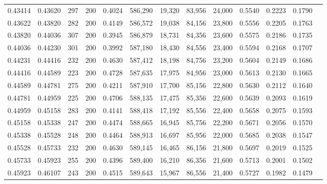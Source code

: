 \begin{tabular}{rrrrrrrrrrrrr}
0.43414 & 0.43620 &    297 & 200 &                                     0.4024 & 586,290 &  19,320 &  83,956 &  24,000 & 0.5540 & 0.2223 & 0.1790 \\
0.43622 & 0.43820 &    282 & 200 &                                     0.4149 & 586,572 &  19,038 &  84,156 &  23,800 & 0.5556 & 0.2205 & 0.1763 \\
0.43820 & 0.44036 &    307 & 200 &                                     0.3945 & 586,879 &  18,731 &  84,356 &  23,600 & 0.5575 & 0.2186 & 0.1735 \\
0.44036 & 0.44230 &    301 & 200 &                                     0.3992 & 587,180 &  18,430 &  84,556 &  23,400 & 0.5594 & 0.2168 & 0.1707 \\
0.44231 & 0.44416 &    232 & 200 &                                     0.4630 & 587,412 &  18,198 &  84,756 &  23,200 & 0.5604 & 0.2149 & 0.1686 \\
0.44416 & 0.44589 &    223 & 200 &                                     0.4728 & 587,635 &  17,975 &  84,956 &  23,000 & 0.5613 & 0.2130 & 0.1665 \\
0.44589 & 0.44781 &    275 & 200 &                                     0.4211 & 587,910 &  17,700 &  85,156 &  22,800 & 0.5630 & 0.2112 & 0.1640 \\
0.44781 & 0.44959 &    225 & 200 &                                     0.4706 & 588,135 &  17,475 &  85,356 &  22,600 & 0.5639 & 0.2093 & 0.1619 \\
0.44959 & 0.45158 &    283 & 200 &                                     0.4141 & 588,418 &  17,192 &  85,556 &  22,400 & 0.5658 & 0.2075 & 0.1593 \\
0.45158 & 0.45338 &    247 & 200 &                                     0.4474 & 588,665 &  16,945 &  85,756 &  22,200 & 0.5671 & 0.2056 & 0.1570 \\
0.45338 & 0.45528 &    248 & 200 &                                     0.4464 & 588,913 &  16,697 &  85,956 &  22,000 & 0.5685 & 0.2038 & 0.1547 \\
0.45528 & 0.45733 &    232 & 200 &                                     0.4630 & 589,145 &  16,465 &  86,156 &  21,800 & 0.5697 & 0.2019 & 0.1525 \\
0.45733 & 0.45923 &    255 & 200 &                                     0.4396 & 589,400 &  16,210 &  86,356 &  21,600 & 0.5713 & 0.2001 & 0.1502 \\
0.45923 & 0.46107 &    243 & 200 &                                     0.4515 & 589,643 &  15,967 &  86,556 &  21,400 & 0.5727 & 0.1982 & 0.1479 \\

\end{tabular}
